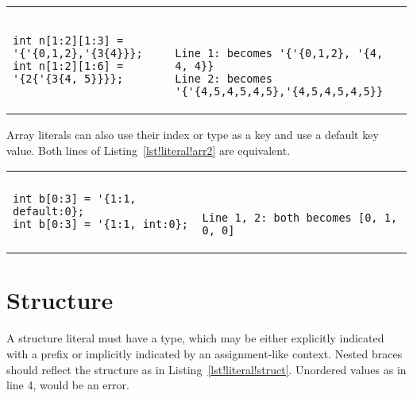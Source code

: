 \begin{table}
\begin{tabular}{p{} p{}}
\begin{lstlisting}[label=lst!literal!array, caption=Array Literal
    examples]
int n[1:2][1:3] = '{'{0,1,2},'{3{4}}};
int n[1:2][1:6] = '{2{'{3{4, 5}}}};
\end{lstlisting}
&
\begin{tbldesc}
\begin{verbatim}


Line 1: becomes '{'{0,1,2}, '{4, 4, 4}}
Line 2: becomes '{'{4,5,4,5,4,5},'{4,5,4,5,4,5}}
\end{verbatim}
\end{tbldesc}
\end{tabular}
\end{table}

Array literals can also use their index or type as a key and use a
default key value. Both lines of Listing~\ref{lst!literal!arr2} are
equivalent.
\begin{table}
\begin{tabular}{p{} p{}}
\begin{lstlisting}[label=lst!literal!arr2, caption=Array Literal with
    default value]
int b[0:3] = '{1:1, default:0};
int b[0:3] = '{1:1, int:0};
\end{lstlisting}
&
\begin{tbldesc}
\begin{verbatim}


Line 1, 2: both becomes [0, 1, 0, 0]
\end{verbatim}
\end{tbldesc}
\end{tabular}
\end{table}

\section{Structure}
A structure literal must have a type, which may be either explicitly
indicated with a prefix or implicitly indicated by an assignment-like
context. Nested braces should reflect the structure as in
Listing~\ref{lst!literal!struct}. Unordered values as in line 4, would
be an error.

